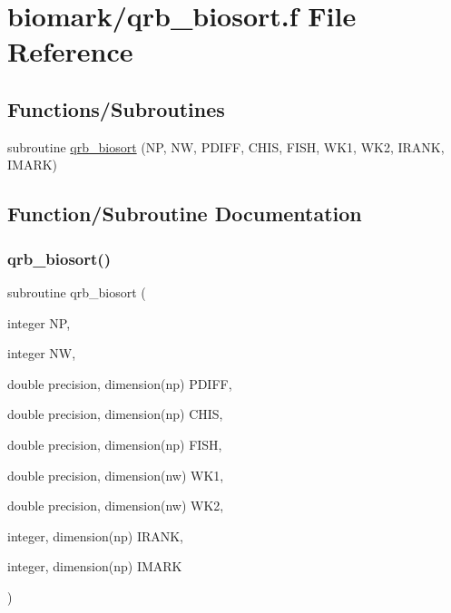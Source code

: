\hypertarget{qrb__biosort_8f}{}\section{biomark/qrb\+\_\+biosort.f File Reference}
\label{qrb__biosort_8f}
\subsection*{Functions/\+Subroutines}
\begin{DoxyCompactItemize}
\item 
subroutine \hyperlink{qrb__biosort_8f_a2f382bef29220f9981fba81f45e84fae}{qrb\+\_\+biosort} (NP, NW, P\+D\+I\+FF, C\+H\+IS, F\+I\+SH, W\+K1, W\+K2, I\+R\+A\+NK, I\+M\+A\+RK)
\end{DoxyCompactItemize}


\subsection{Function/\+Subroutine Documentation}
\mbox{\label{qrb__biosort_8f_a2f382bef29220f9981fba81f45e84fae}} 
\subsubsection{\texorpdfstring{qrb\+\_\+biosort()}{qrb\_biosort()}}
{\footnotesize\ttfamily subroutine qrb\+\_\+biosort (\begin{DoxyParamCaption}\item[{integer}]{NP,  }\item[{integer}]{NW,  }\item[{double precision, dimension(np)}]{P\+D\+I\+FF,  }\item[{double precision, dimension(np)}]{C\+H\+IS,  }\item[{double precision, dimension(np)}]{F\+I\+SH,  }\item[{double precision, dimension(nw)}]{W\+K1,  }\item[{double precision, dimension(nw)}]{W\+K2,  }\item[{integer, dimension(np)}]{I\+R\+A\+NK,  }\item[{integer, dimension(np)}]{I\+M\+A\+RK }\end{DoxyParamCaption})}

